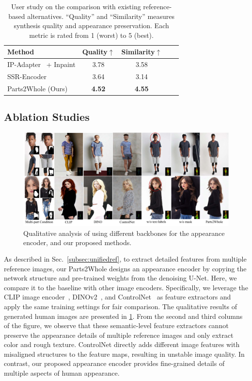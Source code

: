 \begin{table}
  \centering
  \caption{User study on the comparison with existing reference-based alternatives. ``Quality'' and ``Similarity'' measures synthesis quality and appearance preservation. Each metric is rated from 1 (worst) to 5 (best).}
  \begin{tabular}{@{}lcccc@{}}
    \toprule
    Method & Quality$\uparrow$ & Similarity$\uparrow$ \\
    \midrule
    IP-Adapter~\cite{ye2023ipadapter} + Inpaint &  3.78 & 3.58  \\
    SSR-Encoder~\cite{zhang2024ssrencoder} & 3.64  & 3.14 \\
   Parts2Whole (Ours) & \textbf{4.52} & \textbf{4.55} \\
    \bottomrule
  \end{tabular}
  \label{tab:user_study}
\end{table}

\subsection{Ablation Studies}

\begin{figure}
    \centering
    \includegraphics[width=\textwidth]{figure/ablation.pdf}
    \caption{Qualitative analysis of using different backbones for the appearance encoder, and our proposed methods.}
    \label{fig:ablation}
\end{figure}

As described in Sec.~\ref{subsec:unifiedref}, to extract detailed features from multiple reference images, our Parts2Whole designs an appearance encoder by copying the network structure and pre-trained weights from the denoising U-Net. Here, we compare it to the baseline with other image encoders. Specifically, we leverage the CLIP image encoder~\cite{radford2021clip}, DINOv2~\cite{oquab2024dinov2}, and ControlNet~\cite{zhang2023controlnet} as feature extractors and apply the same training settings for fair comparison. The qualitative results of generated human images are presented in \cref{fig:ablation}. From the second and third columns of the figure, we observe that these semantic-level feature extractors cannot preserve the appearance details of multiple reference images and only extract color and rough texture. ControlNet directly adds different image features with misaligned structures to the feature maps, resulting in unstable image quality. In contrast, our proposed appearance encoder provides fine-grained details of multiple aspects of human appearance.

